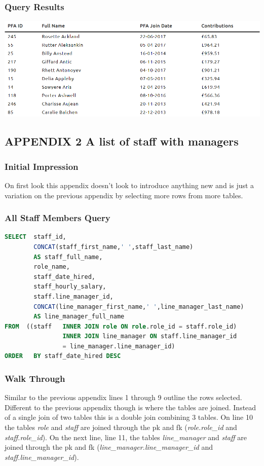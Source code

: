 \documentclass{article}
\begin{document}
\subsubsection{Query Results}
\includegraphics[width=\linewidth]{images/01.png}

\subsection{APPENDIX 2 A list of staff with managers}
\subsubsection{Initial Impression} On first look this appendix doesn't look to introduce anything new and is just a variation on the previous appendix by selecting more rows from more tables.

\subsubsection{All Staff Members Query}
\begin{lstlisting}[language=sql, caption=All Staff Members Query, style=mystyle]
SELECT  staff_id,
        CONCAT(staff_first_name,' ',staff_last_name) 
        AS staff_full_name,
        role_name,
        staff_date_hired,
        staff_hourly_salary,
        staff.line_manager_id,
        CONCAT(line_manager_first_name,' ',line_manager_last_name) 
        AS line_manager_full_name 
FROM  ((staff   INNER JOIN role ON role.role_id = staff.role_id)
                INNER JOIN line_manager ON staff.line_manager_id 
                = line_manager.line_manager_id)
ORDER   BY staff_date_hired DESC
\end{lstlisting}

\subsubsection{Walk Through} Similar to the previous appendix lines 1 through 9 outline the rows selected. Different to the previous appendix though is where the tables are joined. Instead of a single join of two tables this is a double join combining 3 tables. On line 10 the tables \textit{role} and \textit{staff} are joined through the \acrshort{pk} and \acrshort{fk}  (\textit{role.role\_id} and \textit{staff.role\_id}). On the next line, line 11, the tables \textit{line\_manager} and \textit{staff} are joined through the \acrshort{pk} and \acrshort{fk} (\textit{line\_manager.line\_manager\_id} and \textit{staff.line\_manager\_id}).
\end{document}

